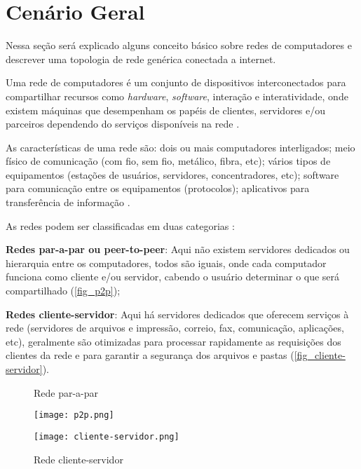 \section{Cenário Geral} \label{sec:cenario-geral}

Nessa seção será explicado alguns conceito básico sobre redes de computadores e descrever uma topologia de rede genérica conectada a internet.

Uma rede de computadores é um conjunto de dispositivos interconectados para compartilhar recursos como \textit{hardware}, \textit{software}, interação e interatividade, onde existem máquinas que desempenham os papéis de clientes, servidores e/ou parceiros dependendo do serviços disponíveis na rede \cite{modelo:jose}.

As características de uma rede são: dois ou mais computadores interligados; meio físico de comunicação (com fio, sem fio, metálico, fibra, etc); vários tipos de equipamentos (estações de usuários, servidores, concentradores, etc); software para comunicação entre os equipamentos (protocolos); aplicativos para transferência de informação \cite{esr:arquitetura}.

As redes podem ser classificadas em duas categorias \cite{esr:arquitetura}: 
\begin{alineas}
\item \textbf{Redes par-a-par ou peer-to-peer}: Aqui não existem servidores dedicados ou hierarquia entre os computadores, todos são iguais, onde cada computador funciona como cliente e/ou servidor, cabendo o usuário determinar o que será compartilhado (\autoref{fig_p2p});
\item \textbf{Redes cliente-servidor}: Aqui há servidores dedicados que oferecem serviços à rede (servidores de arquivos e impressão, correio, fax, comunicação, aplicações, etc), geralmente são otimizadas para processar rapidamente as requisições dos clientes da rede e para garantir a segurança dos arquivos e pastas (\autoref{fig_cliente-servidor}). 
\end{alineas}

\begin{figure}[!htb]
 \label{fig:arquitetura-redes}
 \centering
 \begin{minipage}{0.4\textwidth}
  \centering
  \caption{Rede par-a-par} \label{fig_p2p}
  \texttt{[image: p2p.png]}
 \end{minipage}
 \hfill
 \begin{minipage}{0.4\textwidth}
  \centering
  \caption{Rede cliente-servidor} \label{fig_cliente-servidor}
  \texttt{[image: cliente-servidor.png]}
 \end{minipage}
\end{figure}

